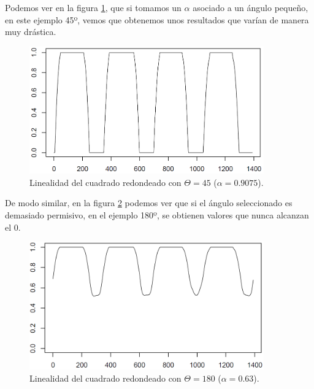 Podemos ver en la figura \ref{fig6}, que si tomamos un $\alpha$ asociado a un ángulo pequeño, en este ejemplo 45º, vemos que obtenemos unos resultados que varían de manera muy drástica.

\begin{figure}[H]
\begin{center}

\includegraphics[width=0.9\textwidth]{img/lin-dev3-1-limpio-09075.png}
\end{center}

\caption{Linealidad del cuadrado redondeado con $\Theta = 45$ ($\alpha = 0.9075$).}
\label{fig6}
\end{figure}

De modo similar, en la figura \ref{fig7} podemos ver que si el ángulo seleccionado es demasiado permisivo, en el ejemplo 180º, se obtienen valores que nunca alcanzan el 0.\\

\begin{figure}[H]
\begin{center}

\includegraphics[width=0.9\textwidth]{img/lin-dev3-1-limpio-063.png}
\end{center}

\caption{Linealidad del cuadrado redondeado con $\Theta = 180$ ($\alpha = 0.63$).}
\label{fig7}
\end{figure}

